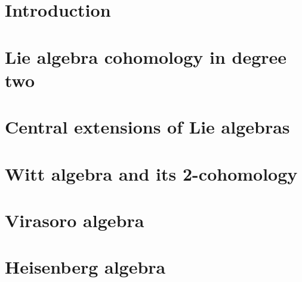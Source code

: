 %

\chapter{Introduction}


\chapter{Lie algebra cohomology in degree two}


\chapter{Central extensions of Lie algebras}


\chapter{Witt algebra and its 2-cohomology}


\chapter{Virasoro algebra}


\chapter{Heisenberg algebra}

